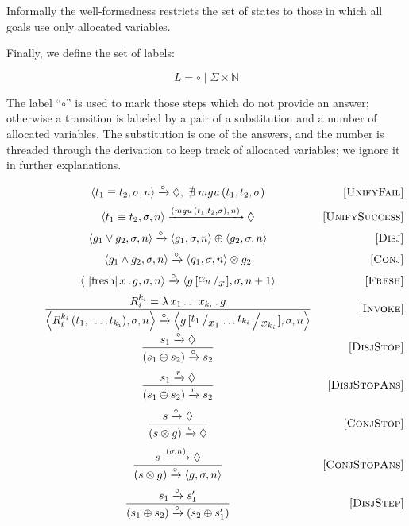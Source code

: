 Informally the well-formedness restricts the set of states to those in which all goals use only allocated variables.

Finally, we define the set of labels:

\[
L = \circ \mid \Sigma\times \mathbb{N}
\]

The label ``$\circ$'' is used to mark those steps which do not provide an answer; otherwise a transition is labeled by a pair of a substitution and a number of allocated
variables. The substitution is one of the answers, and the number is threaded through the derivation to keep track of allocated variables; we ignore it in further explanations.

\begin{figure}
  \[
  \begin{array}{cr}
    \inbr{t_1 \equiv t_2, \sigma, n} \xrightarrow{\circ} \Diamond , \, \, \nexists\; mgu\,(t_1, t_2, \sigma) &\ruleno{UnifyFail} \\[2mm]
    \inbr{t_1 \equiv t_2, \sigma, n} \xrightarrow{(mgu\,(t_1, t_2, \sigma),\, n)} \Diamond & \ruleno{UnifySuccess} \\[2mm]
    \inbr{g_1 \lor g_2, \sigma, n} \xrightarrow{\circ} \inbr{g_1, \sigma, n} \oplus \inbr{g_2, \sigma, n} & \ruleno{Disj} \\[2mm]
    \inbr{g_1 \land g_2, \sigma, n} \xrightarrow{\circ} \inbr{ g_1, \sigma, n} \otimes g_2 & \ruleno{Conj} \\[2mm]
    \inbr{\mbox{\lstinline|fresh|}\, x\, .\, g, \sigma, n} \xrightarrow{\circ} \inbr{g\,[\bigslant{\alpha_{n}}{x}], \sigma, n + 1} & \ruleno{Fresh}\\[2mm]
    \dfrac{R_i^{k_i}=\lambda\,x_1\dots x_{k_i}\,.\,g}{\inbr{R_i^{k_i}\,(t_1,\dots,t_{k_i}),\sigma,n} \xrightarrow{\circ} \inbr{g\,[\bigslant{t_1}{x_1}\dots\bigslant{t_{k_i}}{x_{k_i}}], \sigma, n}} & \ruleno{Invoke}\\[5mm]
    \dfrac{s_1 \xrightarrow{\circ} \Diamond}{(s_1 \oplus s_2) \xrightarrow{\circ} s_2} & \ruleno{DisjStop}\\[5mm]
    \dfrac{s_1 \xrightarrow{r} \Diamond}{(s_1 \oplus s_2) \xrightarrow{r} s_2} & \ruleno{DisjStopAns}\\[5mm]
    \dfrac{s \xrightarrow{\circ} \Diamond}{(s \otimes g) \xrightarrow{\circ} \Diamond} &\ruleno{ConjStop}\\[5mm]
    \dfrac{s \xrightarrow{(\sigma, n)} \Diamond}{(s \otimes g) \xrightarrow{\circ} \inbr{g, \sigma, n}}  & \ruleno{ConjStopAns}\\[5mm]
    \dfrac{s_1 \xrightarrow{\circ} s'_1}{(s_1 \oplus s_2) \xrightarrow{\circ} (s_2 \oplus s'_1)} &\ruleno{DisjStep}\\[5mm]

\end{array}\]
\end{figure}
